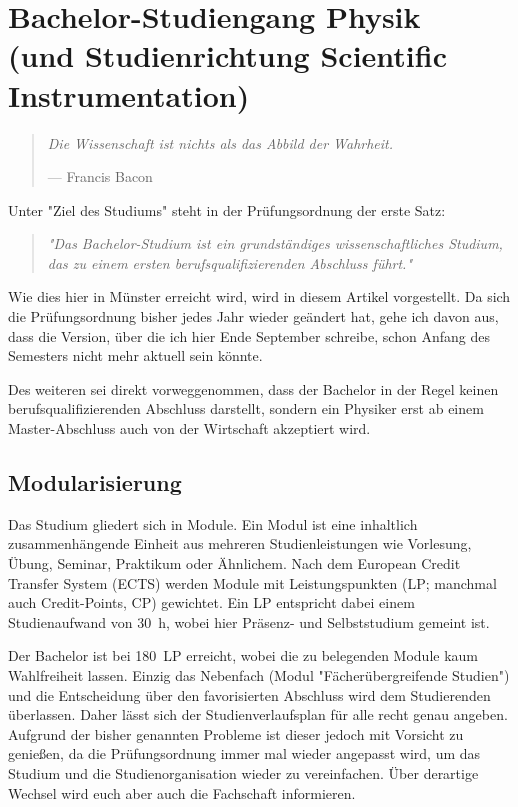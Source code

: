 
\section[Bachelor-Studiengang Physik]{Bachelor-Studiengang Physik\\(und Studienrichtung Scientific Instrumentation)}
\begin{multicols}{2}
\begin{quote}
\textit{Die Wissenschaft ist nichts als das Abbild der Wahrheit.}

\hfill--- Francis Bacon
\end{quote}
Unter "Ziel des Studiums" steht in der Prüfungsordnung der erste Satz:
\begin{quote}
\textit{"Das Bachelor-Studium ist ein grundständiges wissenschaftliches Studium, das zu einem ersten berufsqualifizierenden Abschluss führt."}
\end{quote}
Wie dies hier in Münster erreicht wird, wird in diesem Artikel vorgestellt. Da sich die Prüfungsordnung bisher jedes Jahr wieder geändert hat, gehe ich davon aus, dass die Version, über die ich hier Ende September schreibe, schon Anfang des Semesters nicht mehr aktuell sein könnte.

Des weiteren sei direkt vorweggenommen, dass der Bachelor in der Regel keinen berufsqualifizierenden Abschluss darstellt, sondern ein Physiker erst ab einem Master-Abschluss auch von der Wirtschaft akzeptiert wird.

\subsection*{Modularisierung}
Das Studium gliedert sich in Module. Ein Modul ist eine inhaltlich zusammenhängende Einheit aus mehreren Studienleistungen wie Vorlesung, Übung, Seminar, Praktikum oder Ähnlichem. Nach dem European Credit Transfer System (ECTS) werden Module mit Leistungspunkten (LP; manchmal auch Credit-Points, CP) gewichtet. Ein LP entspricht dabei einem Studienaufwand von \SI{30}{\hour}, wobei hier Präsenz- und Selbststudium gemeint ist.

Der Bachelor ist bei \SI{180}{LP} erreicht, wobei die zu belegenden Module kaum Wahlfreiheit lassen. Einzig das Nebenfach (Modul "Fächerübergreifende Studien") und die Entscheidung über den favorisierten Abschluss wird dem Studierenden überlassen. Daher lässt sich der Studienverlaufsplan für alle recht genau angeben. Aufgrund der bisher genannten Probleme ist dieser jedoch mit Vorsicht zu genießen, da die Prüfungsordnung immer mal wieder angepasst wird, um das Studium und die Studienorganisation wieder zu vereinfachen. Über derartige Wechsel wird euch aber auch die Fachschaft informieren.


\end{multicols}
